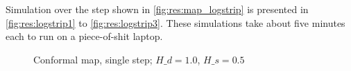 %
%
%
%
%
%
%

Simulation over the step shown in \autoref{fig:res:map_logstrip} is presented in \autoref{fig:res:logstrip1} to \ref{fig:res:logstrip3}.
These simulations take about five minutes each to run on a piece-of-shit laptop.

\begin{figure}[H]%
\centering
{}%
\caption{Conformal map, single step; $H\_d = 1.0$, $H\_s = 0.5$}%
\label{fig:res:map_logstrip}%
\end{figure}

